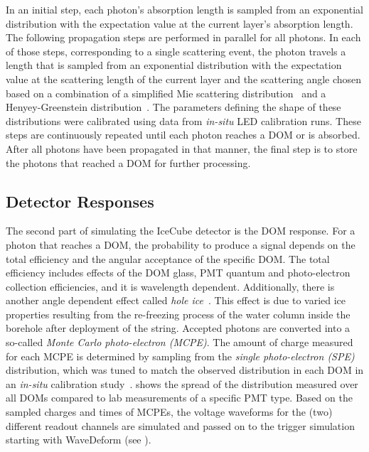 In an initial step, each photon's absorption length is sampled from an exponential distribution with the expectation value at the current layer's absorption length. The following propagation steps are performed in parallel for all photons. In each of those steps, corresponding to a single scattering event, the photon travels a length that is sampled from an exponential distribution with the expectation value at the scattering length of the current layer and the scattering angle chosen based on a combination of a simplified Mie scattering distribution~ and a Henyey-Greenstein distribution~. The parameters defining the shape of these distributions were calibrated using data from \textit{in-situ} LED calibration runs. These steps are continuously repeated until each photon reaches a DOM or is absorbed. After all photons have been propagated in that manner, the final step is to store the photons that reached a DOM for further processing.


\subsection{Detector Responses}

The second part of simulating the IceCube detector is the DOM response. For a photon that reaches a DOM, the probability to produce a signal depends on the total efficiency and the angular acceptance of the specific DOM. The total efficiency includes effects of the DOM glass, PMT quantum and photo-electron collection efficiencies, and it is wavelength dependent. Additionally, there is another angle dependent effect called \textit{hole ice}~. This effect is due to varied ice properties resulting from the re-freezing process of the water column inside the borehole after deployment of the string. Accepted photons are converted into a so-called \textit{Monte Carlo photo-electron (MCPE)}. The amount of charge measured for each MCPE is determined by sampling from the \textit{single photo-electron (SPE)} distribution, which was tuned to match the observed distribution in each DOM in an \textit{in-situ} calibration study~.  shows the spread of the distribution measured over all DOMs compared to lab measurements of a specific PMT type. Based on the sampled charges and times of MCPEs, the voltage waveforms for the (two) different readout channels are simulated and passed on to the trigger simulation starting with WaveDeform (see ).

